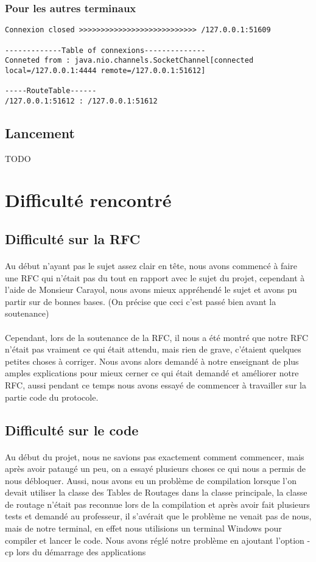 \documentclass[a4paper,titlepage]{report}
\begin{document}
\subsubsection{Pour les autres terminaux}
\begin{lstlisting}
Connexion closed >>>>>>>>>>>>>>>>>>>>>>>>>>> /127.0.0.1:51609

-------------Table of connexions--------------
Conneted from : java.nio.channels.SocketChannel[connected local=/127.0.0.1:4444 remote=/127.0.0.1:51612]

-----RouteTable------
/127.0.0.1:51612 : /127.0.0.1:51612
\end{lstlisting}
\subsection{Lancement}
TODO
\section{Difficulté rencontré}
\subsection{Difficulté sur la RFC}
\paragraph{}
Au début n'ayant pas le sujet assez clair en tête, nous avons commencé à faire une RFC qui n'était pas du tout en rapport avec le sujet du projet, cependant à l'aide de Monsieur Carayol, nous avons mieux appréhendé le sujet et avons pu partir sur de bonnes bases. (On précise que ceci c'est passé bien avant la soutenance)
\paragraph{}
Cependant, lors de la soutenance de la RFC, il nous a été montré que notre RFC n'était pas vraiment ce qui était attendu, mais rien de grave, c'étaient quelques petites choses à corriger.
Nous avons alors demandé à notre enseignant de plus amples explications pour mieux cerner ce qui était demandé et améliorer notre RFC, aussi pendant ce temps nous avons essayé de commencer à travailler sur la partie code du protocole.
\subsection{Difficulté sur le code}
\paragraph{}
Au début du projet, nous ne savions pas exactement comment commencer, mais après avoir pataugé un peu, on a essayé plusieurs choses ce qui nous a permis  de nous débloquer.
Aussi, nous avons eu un problème de compilation lorsque l'on devait utiliser la classe des Tables de Routages dans la classe principale, la classe de routage n'était pas reconnue lors de la compilation et après avoir fait plusieurs tests et demandé au professeur, il s'avérait que le problème ne venait pas de nous, mais de notre terminal, en effet nous utilisions un terminal Windows pour compiler et lancer le code.
Nous avons réglé notre problème en ajoutant l'option -cp lors du démarrage des applications
\end{document}
